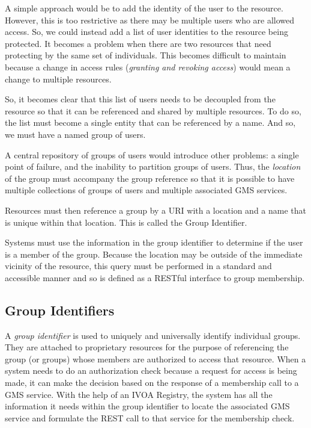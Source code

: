 \documentclass[11pt,a4paper]{ivoa}
\begin{document}
A simple approach would be to add the identity of the user to the resource.  However, this is too restrictive as there may be multiple users who are allowed access.  So, we could instead add a list of user identities to the resource being protected.  It becomes a problem when there are two resources that need protecting by the same set of individuals.  This becomes difficult to maintain because a change in access rules (\emph{granting and revoking access}) would mean a change to multiple resources.

So, it becomes clear that this list of users needs to be decoupled from the resource so that it can be referenced and shared by multiple resources.  To do so, the list must become a single entity that can be referenced by a name.  And so, we must have a named group of users.

A central repository of groups of users would introduce other problems:  a single point of failure, and the inability to partition groups of users.  Thus, the \emph{location} of the group must accompany the group reference so that it is possible to have multiple collections of groups of users and multiple associated GMS services.

Resources must then reference a group by a URI with a location and a name that is unique within that location.  This is called the Group Identifier.

Systems must use the information in the group identifier to determine if the user is a member of the group.  Because the location may be outside of the immediate vicinity of the resource, this query must be performed in a standard and accessible manner and so is defined as a RESTful interface to group membership.

\subsection{Group Identifiers}
\label{subsec:groupids}

A \emph{group identifier} is used to uniquely and universally identify individual groups.  They are attached to proprietary resources for the purpose of referencing the group (or groups) whose members are authorized to access that resource.  When a system needs to do an authorization check because a request for access is being made, it can make the decision based on the response of a membership call to a GMS service.  With the help of an IVOA Registry, the system has all the information it needs within the group identifier to locate the associated GMS service and formulate the REST call to that service for the membership check.
\end{document}

